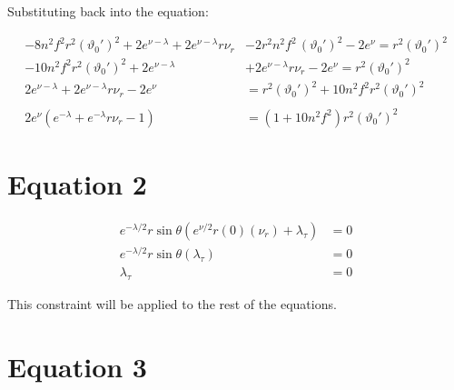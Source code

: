 \documentclass[12pt]{article}
\begin{document}
Substituting back into the equation:

\begin{align}
  -8 n^2 f^2 r^2 (\vartheta_0')^2 + 2e^{\nu - \lambda} + 2e^{\nu - \lambda}r \nu_r &- 2 r^2 n^2 f^2 \, (\vartheta_0')^2 - 2e^{\nu} = r^2 (\vartheta_0')^2 \nonumber \\
  -10 n^2 f^2 r^2 (\vartheta_0')^2 + 2e^{\nu - \lambda} &+ 2e^{\nu - \lambda}r \nu_r - 2e^{\nu} = r^2 (\vartheta_0')^2 \nonumber \\
  2e^{\nu - \lambda} + 2e^{\nu - \lambda}r \nu_r - 2e^{\nu} &= r^2 (\vartheta_0')^2 + 10 n^2 f^2 r^2 (\vartheta_0')^2 \nonumber \\ \nonumber \\
  2e^{\nu} \left(e^{-\lambda} + e^{-\lambda}r \nu_r - 1\right) &= \left(1 + 10 n^2 f^2\right) r^2 (\vartheta_0')^2
\end{align}

\section*{Equation 2}

\begin{align}
  e^{-\lambda/2} r \sin\theta \left(e^{\nu/2}r(0)(\nu_r) + \lambda_\tau \right) &= 0 \nonumber \\
  e^{-\lambda/2} r \sin\theta (\lambda_\tau) &= 0 \nonumber \\
  \lambda_\tau &= 0
\end{align}

This constraint will be applied to the rest of the equations.

\section*{Equation 3}
\end{document}
